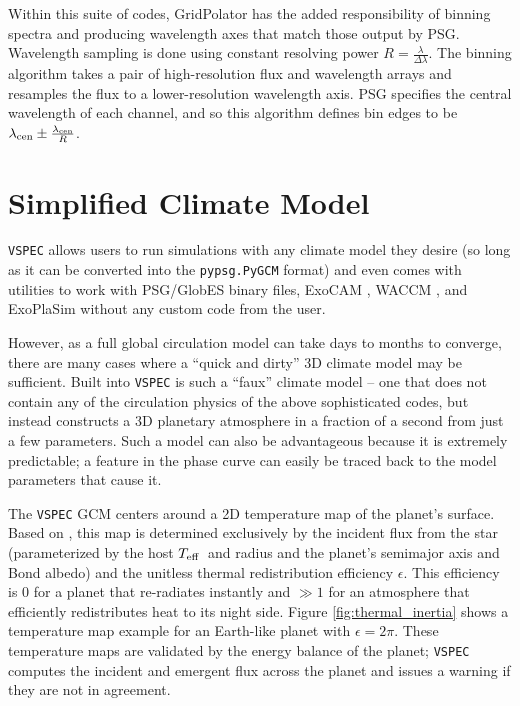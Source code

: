 \documentclass[twocolumn]{aastex631}
\newcommand{\teff}{$T_{\rm eff}$}
\newcommand{\vspec}[1]{\texttt{VSPEC}#1}
\begin{document}
Within this suite of codes, GridPolator has the added responsibility of binning spectra and producing wavelength axes that match those output by PSG. Wavelength sampling is done using constant resolving power $R=\frac{\lambda}{\Delta \lambda}$. The binning algorithm takes a pair of high-resolution flux and wavelength arrays and resamples the flux to a lower-resolution wavelength axis. PSG specifies the central wavelength of each channel, and so this algorithm defines bin edges to be $\lambda_{\rm cen} \pm \frac{\lambda_{\rm cen}}{R}$.

\section{Simplified Climate Model}
\label{sec:vspec-gcm}
\vspec{} allows users to run simulations with any climate model they desire (so long as it can be converted into the \texttt{pypsg.PyGCM} format) and even comes with utilities to work with PSG/GlobES binary files, ExoCAM \citep{wolf2022}, WACCM \citep{marsh2013}, and ExoPlaSim \citep{paradise2022} without any custom code from the user.

However, as a full global circulation model can take days to months to converge, there are many cases where a ``quick and dirty'' 3D climate model may be sufficient. Built into \vspec{} is such a ``faux'' climate model -- one that does not contain any of the circulation physics of the above sophisticated codes, but instead constructs a 3D planetary atmosphere in a fraction of a second from just a few parameters. Such a model can also be advantageous because it is extremely predictable; a feature in the phase curve can easily be traced back to the model parameters that cause it.

The \vspec{} GCM centers around a 2D temperature map of the planet's surface. Based on \citet{cowan2011}, this map
is determined exclusively by the incident flux from the star (parameterized by the host \teff~and radius
and the planet's semimajor axis and Bond albedo) and the unitless thermal redistribution efficiency $\epsilon$.
This efficiency is 0 for a planet that re-radiates instantly and $\gg 1$ for an atmosphere that efficiently redistributes heat to its night side. Figure \ref{fig:thermal_inertia} shows a temperature map example for an Earth-like planet with $\epsilon = 2\pi$. These temperature maps are validated by the energy balance of the planet; \vspec{} computes the incident and emergent flux across the planet and issues a warning if they are not in agreement.
\end{document}
